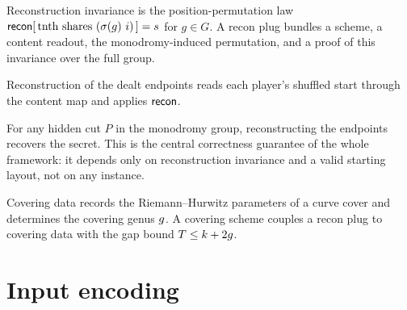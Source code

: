 \begin{definition}
  \label{def:recon_plug}
  \rocqok
  Reconstruction invariance is the position-permutation law
  $\mathsf{recon}[\,\text{tnth shares}~(\sigma(g)~i)\,] = s$ for $g\in G$. A recon
  plug bundles a scheme, a content readout, the monodromy-induced permutation,
  and a proof of this invariance over the full group.
\end{definition}

\begin{definition}
  \label{def:pgg_recon}
  \rocqok
  Reconstruction of the dealt endpoints reads each player's shuffled start
  through the content map and applies $\mathsf{recon}$.
\end{definition}

\begin{theorem}
  \label{thm:recon_monodromy_correct}
  \rocqok
  For any hidden cut $P$ in the monodromy group, reconstructing the endpoints
  recovers the secret. This is the central correctness guarantee of the whole
  framework: it depends only on reconstruction invariance and a valid starting
  layout, not on any instance.
\end{theorem}

\begin{definition}
  \label{def:covering_scheme}
  \rocqok
  Covering data records the Riemann--Hurwitz parameters of a curve cover and
  determines the covering genus $g$. A covering scheme couples a recon plug
  to covering data with the gap bound $T \le k + 2g$.
\end{definition}

\chapter{Input encoding}

